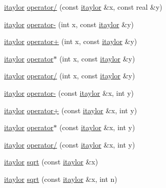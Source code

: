 \begin{DoxyCompactItemize}
\item 
\hyperlink{classtaylor_1_1itaylor}{itaylor} \hyperlink{classtaylor_1_1itaylor_ab591d69abfbe913108d9ccea1183298f}{operator/} (const \hyperlink{classtaylor_1_1itaylor}{itaylor} \&x, const real \&y)
\item 
\hyperlink{classtaylor_1_1itaylor}{itaylor} \hyperlink{classtaylor_1_1itaylor_a96139ed4982a0e407e0187f1c9425cb4}{operator-\/} (int x, const \hyperlink{classtaylor_1_1itaylor}{itaylor} \&y)
\item 
\hyperlink{classtaylor_1_1itaylor}{itaylor} \hyperlink{classtaylor_1_1itaylor_a6be136bb60c027951f94d54f9b8d0ff5}{operator+} (int x, const \hyperlink{classtaylor_1_1itaylor}{itaylor} \&y)
\item 
\hyperlink{classtaylor_1_1itaylor}{itaylor} \hyperlink{classtaylor_1_1itaylor_a6b7bbd3af3ce5d85def7fcdbe95a06f8}{operator$\ast$} (int x, const \hyperlink{classtaylor_1_1itaylor}{itaylor} \&y)
\item 
\hyperlink{classtaylor_1_1itaylor}{itaylor} \hyperlink{classtaylor_1_1itaylor_a70eabbfdbdec4404ab091ce00545e445}{operator/} (int x, const \hyperlink{classtaylor_1_1itaylor}{itaylor} \&y)
\item 
\hyperlink{classtaylor_1_1itaylor}{itaylor} \hyperlink{classtaylor_1_1itaylor_ad3b9e1d94001b31dc4861877b3ec0600}{operator-\/} (const \hyperlink{classtaylor_1_1itaylor}{itaylor} \&x, int y)
\item 
\hyperlink{classtaylor_1_1itaylor}{itaylor} \hyperlink{classtaylor_1_1itaylor_a98eab5582ff2ae2c7f6356a56d0122e8}{operator+} (const \hyperlink{classtaylor_1_1itaylor}{itaylor} \&x, int y)
\item 
\hyperlink{classtaylor_1_1itaylor}{itaylor} \hyperlink{classtaylor_1_1itaylor_ab24d929f8b7e5d01e7458a10d90b3603}{operator$\ast$} (const \hyperlink{classtaylor_1_1itaylor}{itaylor} \&x, int y)
\item 
\hyperlink{classtaylor_1_1itaylor}{itaylor} \hyperlink{classtaylor_1_1itaylor_aa6d4ea2601ec7cb03450f2816b05daa3}{operator/} (const \hyperlink{classtaylor_1_1itaylor}{itaylor} \&x, int y)
\item 
\hyperlink{classtaylor_1_1itaylor}{itaylor} \hyperlink{classtaylor_1_1itaylor_a9ef6e81a1ceb32ee143c301365a35980}{sqrt} (const \hyperlink{classtaylor_1_1itaylor}{itaylor} \&x)
\item 
\hyperlink{classtaylor_1_1itaylor}{itaylor} \hyperlink{classtaylor_1_1itaylor_af0cb94a71f65eb8f77698f7df2ab403c}{sqrt} (const \hyperlink{classtaylor_1_1itaylor}{itaylor} \&x, int n)
\item 

\end{DoxyCompactItemize}
